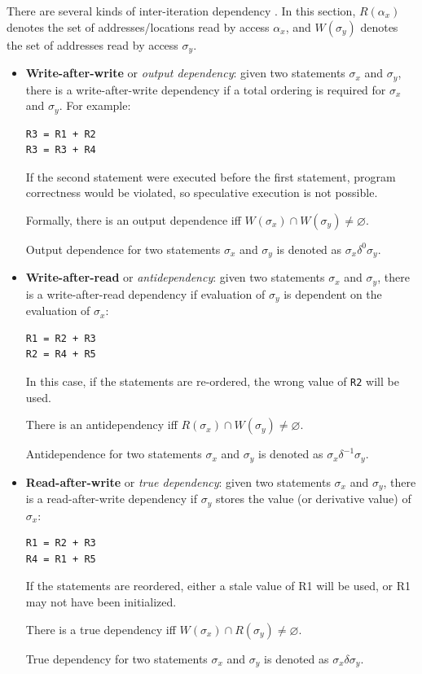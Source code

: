 	There are several kinds of inter-iteration dependency \citep[p.~526]{Ibbett2009,ArchitectureBook}. In this section, $R(\alpha_x)$ denotes the set of addresses/locations read by access $\alpha_x$, and $W(\sigma_y)$ denotes the set of addresses read by access $\sigma_y$.
	
	\begin{itemize}\label{fig:dep-kinds}
		\item \textbf{Write-after-write} or \textit{output dependency}: given two statements $\sigma_x$ and $\sigma_y$, there is a write-after-write dependency if a total ordering is required for $\sigma_x$ and $\sigma_y$. For example:
		
		\begin{lstlisting}
R3 = R1 + R2
R3 = R3 + R4\end{lstlisting}
		
		If the second statement were executed before the first statement, program correctness would be violated, so speculative execution is not possible.
		
		Formally, there is an output dependence iff $W(\sigma_x) \cap W(\sigma_y) \neq \varnothing$.
		
		Output dependence for two statements $\sigma_x$ and $\sigma_y$ is denoted as $\sigma_x \delta^0 \sigma_y$.
		
		\item \textbf{Write-after-read} or \textit{antidependency}: given two statements $\sigma_x$ and $\sigma_y$, there is a write-after-read dependency if evaluation of $\sigma_y$ is dependent on the evaluation of $\sigma_x$:
		
		\begin{lstlisting}
R1 = R2 + R3
R2 = R4 + R5\end{lstlisting}
		
		In this case, if the statements are re-ordered, the wrong value of \texttt{R2} will be used.
		
		There is an antidependency iff $R(\sigma_x) \cap W(\sigma_y) \neq \varnothing$.
		
		Antidependence for two statements $\sigma_x$ and $\sigma_y$ is denoted as $\sigma_x \delta^{-1} \sigma_y$.
		
		\item \textbf{Read-after-write} or \textit{true dependency}: given two statements $\sigma_x$ and $\sigma_y$, there is a read-after-write dependency if $\sigma_y$ stores the value (or derivative value) of $\sigma_x$:
		
		\begin{lstlisting}
R1 = R2 + R3
R4 = R1 + R5\end{lstlisting}
		
		If the statements are reordered, either a stale value of R1 will be used, or R1 may not have been initialized.
		
		There is a true dependency iff $W(\sigma_x) \cap R(\sigma_y) \neq \varnothing$.
		
		True dependency for two statements $\sigma_x$ and $\sigma_y$ is denoted as $\sigma_x \delta \sigma_y$.
	\end{itemize}
	
